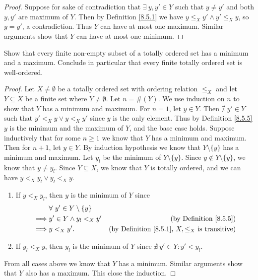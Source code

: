 \begin{proof}
    Suppose for sake of contradiction that \(\exists\ y, y' \in Y\) such that \(y \neq y'\) and both \(y, y'\) are maximum of \(Y\).
    Then by Definition \ref{8.5.1} we have \(y \leq_X y' \land y' \leq_X y\), so \(y = y'\), a contradiction.
    Thus \(Y\) can have at most one maximum.
    Similar arguments show that \(Y\) can have at most one minimum.
\end{proof}

\begin{exercise}\label{ex 8.5.8}
    Show that every finite non-empty subset of a totally ordered set has a minimum and a maximum.
    Conclude in particular that every finite totally ordered set is well-ordered.
\end{exercise}

\begin{proof}
    Let \(X \neq \emptyset\) be a totally ordered set with ordering relation \(\leq_X\) and let \(Y \subseteq X\) be a finite set where \(Y \neq \emptyset\).
    Let \(n = \#(Y)\).
    We use induction on \(n\) to show that \(Y\) has a minimum and maximum.
    For \(n = 1\), let \(y \in Y\).
    Then \(\nexists\ y' \in Y\) such that \(y' <_X y \lor y <_X y'\) since \(y\) is the only element.
    Thus by Definition \ref{8.5.5} \(y\) is the minimum and the maximum of \(Y\), and the base case holds.
    Suppose inductively that for some \(n \geq 1\) we know that \(Y\) has a minimum and maximum.
    Then for \(n + 1\), let \(y \in Y\).
    By induction hypothesis we know that \(Y \setminus \{y\}\) has a minimum and maximum.
    Let \(y_l\) be the minimum of \(Y \setminus \{y\}\).
    Since \(y \notin Y \setminus \{y\}\), we know that \(y \neq y_l\).
    Since \(Y \subseteq X\), we know that \(Y\) is totally ordered, and we can have \(y <_X y_l \lor y_l <_X y\).
    \begin{enumerate}
        \item If \(y <_X y_l\), then \(y\) is the minimum of \(Y\) since
              \begin{align*}
                           & \forall\ y' \in Y \setminus \{y\}                                                                   \\
                  \implies & y' \in Y \land y_l <_X y'         & \text{(by Definition \ref{8.5.5})}                              \\
                  \implies & y <_X y'.                         & \text{(by Definition \ref{8.5.1}, \(X, \leq_X\) is transitive)}
              \end{align*}
        \item If \(y_l <_X y\), then \(y_l\) is the minimum of \(Y\) since \(\nexists\ y' \in Y : y' < y_l\).
    \end{enumerate}
    From all cases above we know that \(Y\) has a minimum.
    Similar arguments show that \(Y\) also has a maximum.
    This close the induction.
\end{proof}

